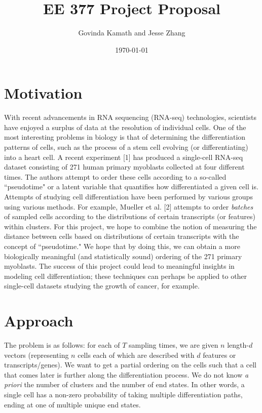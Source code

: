 \documentclass[11pt,onecolumn]{article}
\title{EE 377 Project Proposal}
\author{Govinda Kamath and Jesse Zhang}
\date{\today}
\begin{document}
\maketitle
 
\section{Motivation}
With recent advancements in RNA sequencing (RNA-seq) technologies, scientists have enjoyed a surplus of data at the resolution of individual cells. One of the most interesting problems in biology is that of determining the differentiation patterns of cells, such as the process of a stem cell evolving (or differentiating) into a heart cell. A recent experiment [1] has produced a single-cell RNA-seq dataset consisting of 271 human primary myoblasts collected at four different times. The authors attempt to order these cells according to a so-called ``pseudotime" or a latent variable that quantifies how differentiated a given cell is. Attempts of studying cell differentiation have been performed by various groups using various methods. For example, Mueller et al. [2] attempts to order \textit{batches} of sampled cells according to the distributions of certain transcripts (or features) within clusters. For this project, we hope to combine the notion of measuring the distance between cells based on distributions of certain transcripts with the concept of ``pseudotime." We hope that by doing this, we can obtain a more biologically meaningful (and statistically sound) ordering of the 271 primary myoblasts. The success of this project could lead to meaningful insights in modeling cell differentiation; these techniques can perhaps be applied to other single-cell datasets studying the growth of cancer, for example.

\section{Approach}
The problem is as follows: for each of $T$ sampling times, we are given $n$ length-$d$ vectors (representing $n$ cells each of which are described with $d$ features or transcripts/genes). We want to get a partial ordering on the cells such that a cell that comes later is further along the differentiation process. We do not know \textit{a priori} the number of clusters and the number of end states. In other words, a single cell has a non-zero probability of taking multiple differentiation paths, ending at one of multiple unique end states. \\
\end{document}
